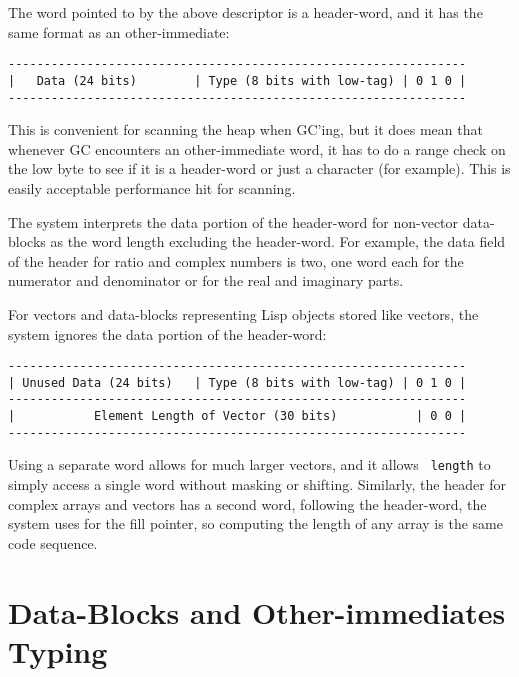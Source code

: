 The word pointed to by the above descriptor is a header-word, and it has the
same format as an other-immediate:
\begin{verbatim}
----------------------------------------------------------------
|   Data (24 bits)        | Type (8 bits with low-tag) | 0 1 0 |
----------------------------------------------------------------
\end{verbatim}
This is convenient for scanning the heap when GC'ing, but it does mean that
whenever GC encounters an other-immediate word, it has to do a range check on
the low byte to see if it is a header-word or just a character (for example).
This is easily acceptable performance hit for scanning.

The system interprets the data portion of the header-word for non-vector
data-blocks as the word length excluding the header-word.  For example, the
data field of the header for ratio and complex numbers is two, one word each
for the numerator and denominator or for the real and imaginary parts.

For vectors and data-blocks representing Lisp objects stored like vectors, the
system ignores the data portion of the header-word:
\begin{verbatim}
----------------------------------------------------------------
| Unused Data (24 bits)   | Type (8 bits with low-tag) | 0 1 0 |
----------------------------------------------------------------
|           Element Length of Vector (30 bits)           | 0 0 | 
----------------------------------------------------------------
\end{verbatim}

Using a separate word allows for much larger vectors, and it allows {\tt
length} to simply access a single word without masking or shifting.  Similarly,
the header for complex arrays and vectors has a second word, following the
header-word, the system uses for the fill pointer, so computing the length of
any array is the same code sequence.



\section{Data-Blocks and Other-immediates Typing}

